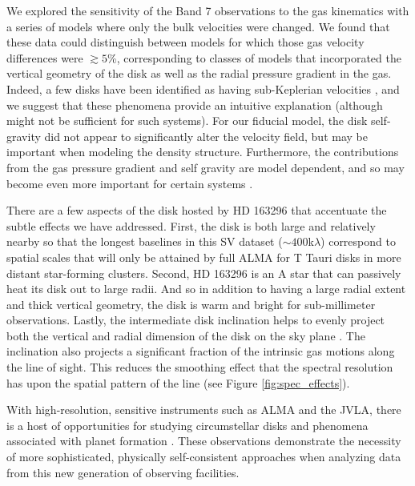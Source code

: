 We explored the sensitivity of the Band 7 observations to the gas kinematics
with a series of models where only the bulk velocities were changed. 
We found that these data could distinguish between models for which those gas 
velocity differences were $\gtrsim 5$\%, corresponding to classes of models that
incorporated the vertical geometry of the disk as well as the radial pressure 
gradient in the gas.  Indeed, a few disks have been identified as 
having sub-Keplerian velocities \citep{wang12}, and we suggest that these 
phenomena provide an intuitive explanation (although might not be sufficient for
such systems).  For our fiducial model, the disk self-gravity did not appear to 
significantly alter the velocity field, but may be important when modeling the 
density structure.  Furthermore, the contributions from the gas pressure 
gradient and self gravity are model dependent, and so may become even more 
important for certain systems \citep[e.g.,][]{cesaroni05,bergin13}.

There are a few aspects of the disk hosted by HD 163296 that accentuate the 
subtle effects we have addressed.  First, the disk is both large and relatively 
nearby so that the longest baselines in this SV dataset ($\sim 400$k$\lambda$) 
correspond to spatial scales that will only be attained by full ALMA for 
T Tauri disks in more distant star-forming clusters.  Second, HD 163296 
is an A star that can passively heat its disk out to large radii.  And so in 
addition to having a large radial extent and thick vertical geometry, the disk 
is warm and bright for sub-millimeter observations.  Lastly, the intermediate 
disk inclination helps to evenly project both the vertical and radial dimension 
of the disk on the sky plane \citep{semenov08}.  The inclination also projects 
a significant fraction of the intrinsic gas motions along the line of sight.
This reduces the smoothing effect that the spectral resolution has upon the 
spatial pattern of the line (see Figure \ref{fig:spec_effects}). 

With high-resolution, sensitive instruments such as ALMA and the JVLA, there is 
a host of opportunities for studying circumstellar disks and phenomena 
associated with planet formation
\citep[e.g.][]{wolf05,semenov08,cossins10,cleeves11,gonzalez12,ruge13}.  These 
observations demonstrate the necessity of more sophisticated, physically 
self-consistent approaches when analyzing data from this new generation of 
observing facilities.
 

